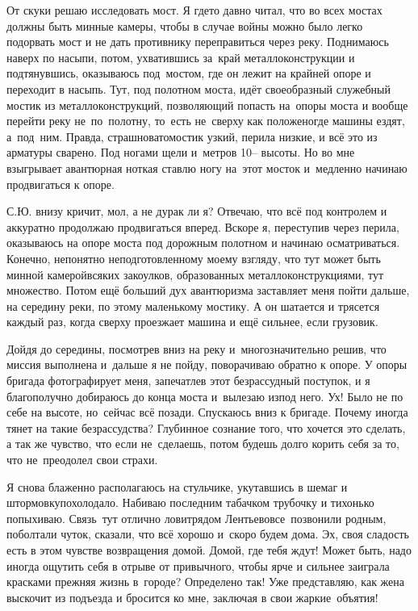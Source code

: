 От скуки решаю исследовать мост. Я где\sdash то давно читал, что во всех мостах должны быть минные камеры, чтобы в случае войны можно было легко подорвать мост и не дать противнику переправиться через реку. Поднимаюсь наверх по насыпи, потом, ухватившись за~край металлоконструкции и подтянувшись, оказываюсь под~мостом, где он лежит на крайней опоре и переходит в насыпь. Тут, под полотном моста, идёт своеобразный служебный мостик из металлоконструкций, позволяющий попасть на~опоры моста и вообще перейти реку не~по~полотну, то~есть не~сверху как положено\mdash где машины ездят, а~под~ним. Правда, страшновато\mdash мостик узкий, перила низкие, и всё это из арматуры сварено. Под ногами щели и~метров 10\thinspace\nobreakdash-- высоты. Но во мне взыгрывает авантюрная нотка\mdash я ставлю ногу на~этот мосток и~медленно начинаю продвигаться к опоре. 

С.Ю. внизу кричит, мол, а не дурак ли я? Отвечаю, что всё под контролем и аккуратно продолжаю продвигаться вперед. Вскоре я, переступив через перила, оказываюсь на опоре моста под дорожным полотном и начинаю осматриваться. Конечно, непонятно неподготовленному моему взгляду, что тут может быть минной камерой\mdash всяких закоулков, образованных металлоконструкциями, тут множество. Потом ещё больший дух авантюризма заставляет меня пойти дальше, на середину реки, по этому маленькому мостику. А он шатается и трясется каждый раз, когда сверху проезжает машина и ещё сильнее, если грузовик. 

Дойдя до середины, посмотрев вниз на реку и~многозначительно решив, что миссия выполнена и~дальше я не пойду, поворачиваю обратно к опоре. У опоры бригада фотографирует меня, запечатлев этот безрассудный поступок, и я благополучно добираюсь до конца моста и~вылезаю из\sdash под него. Ух! Было не по себе на высоте, но~сейчас всё позади. Спускаюсь вниз к бригаде. Почему иногда тянет на такие безрассудства? Глубинное сознание того, что хочется это сделать, а так же чувство, что если не~сделаешь, потом будешь долго корить себя за то, что не~преодолел свои страхи.

Я снова блаженно располагаюсь на стульчике, укутавшись в шемаг и штормовку\mdash похолодало. Набиваю последним табачком трубочку и тихонько попыхиваю. Связь~тут отлично ловит\mdash рядом Лентьево\mdash все~позвонили родным, поболтали чуток, сказали, что всё хорошо и~скоро будем дома. Эх, своя сладость есть в этом чувстве возвращения домой. Домой, где тебя ждут! Может быть, надо иногда ощутить себя в отрыве от привычного, чтобы ярче и сильнее заиграла красками прежняя жизнь в~городе? Определено так! Уже представляю, как жена выскочит из подъезда и бросится ко мне, заключая в свои жаркие~объятия!

